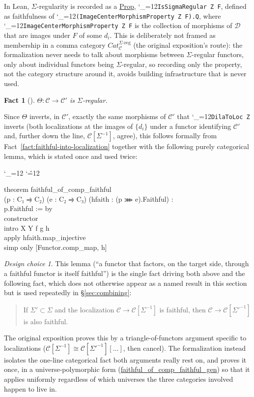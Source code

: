 \documentclass[11pt]{amsart}
\newcommand{\lc}[1]{\url{#1}}
\newcommand{\lcode}{\begingroup\catcode`\_=12\relax\lcodeInner}
\newcommand{\lcodeInner}[1]{\texttt{#1}\endgroup}
\newenvironment{leancode}{%
  \begingroup
  \catcode`\_=12\relax
  \catcode`\^=12\relax
  \small\ttfamily\raggedright\baselineskip=1.15\baselineskip
  \par\smallskip\noindent
}{%
  \par\smallskip
  \endgroup
}
\theoremstyle{plain}
\newtheorem{fact}[theorem]{Fact}
\theoremstyle{definition}
\theoremstyle{remark}
\newtheorem*{designchoice}{Design choice}
\newcommand{\calC}{\mathcal C}
\newcommand{\calD}{\mathcal D}
\begin{document}
In Lean, $\Sigma$-regularity is recorded as a \lc{Prop}, \lcode{IsSigmaRegular Z F}, defined as
faithfulness of \lcode{(ImageCenterMorphismProperty Z F).Q}, where
\lcode{ImageCenterMorphismProperty Z F} is the collection of morphisms of $\calD$ that are
images under $F$ of some $d_i$. This is deliberately not framed as membership in a
comma category $Cat_\calC^{\Sigma\text{-reg}}$ (the original exposition's route): the
formalization never needs to talk about morphisms between $\Sigma$-regular functors,
only about individual functors being $\Sigma$-regular, so recording only the property, not
the category structure around it, avoids building infrastructure that is never used.

\begin{fact}[{\citep[Fact~3.7]{Mayeux}}]
\label{fact:theta-regular}
$\Theta : \calC \to \calC'$ is $\Sigma$-regular.
\end{fact}

Since $\Theta$ inverts, in $\calC'$, exactly the same morphisms of $\calC'$ that
\lcode{DilaToLoc Z} inverts (both localizations at the images of $\{d_i\}$ under a functor
identifying $\calC'$ and, further down the line, $\calC[\Sigma^{-1}]$, agree), this follows
formally from Fact~\ref{fact:faithful-into-localization} together with the following purely
categorical lemma, which is stated once and used twice:

\begin{leancode}
theorem faithful_of_comp_faithful \\
    (p : C₁ ⥤ C₂) (e : C₂ ⥤ C₃) (hfaith : (p ⋙ e).Faithful) : \\
    p.Faithful := by \\
  constructor \\
  intro X Y f g h \\
  apply hfaith.map_injective \\
  simp only [Functor.comp_map, h] \\
\end{leancode}

\begin{designchoice}
This lemma (``a functor that factors, on the target side, through a faithful functor is
itself faithful'') is the single fact driving both \citep[Fact~3.7]{Mayeux} above and the following
fact, which does not otherwise appear as a named result in this section but is used
repeatedly in \S\ref{sec:combining}:
\begin{quote}
If $\Sigma' \subset \Sigma$ and the localization $\calC \to \calC[\Sigma^{-1}]$ is faithful,
then $\calC \to \calC[\Sigma'^{-1}]$ is also faithful.
\end{quote}
The original exposition proves this by a triangle-of-functors argument specific to
localizations ($\calC[\Sigma^{-1}] \cong \calC[\Sigma'^{-1}][\dots]$, then cancel). The
formalization instead isolates the one-line categorical fact both arguments really rest on,
and proves it once, in a universe-polymorphic form (\lc{faithful_of_comp_faithful_gen}) so
that it applies uniformly regardless of which universes the three categories involved happen
to live in.
\end{designchoice}
\end{document}
